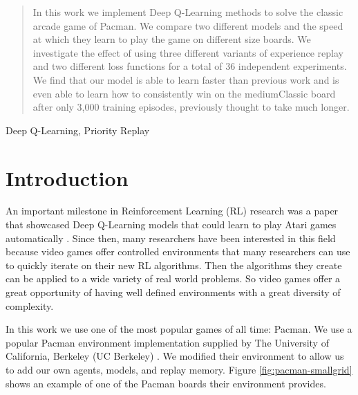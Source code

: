 \documentclass[conference]{IEEEtran}
\begin{document}
\begin{abstract}
In this work we implement Deep Q-Learning methods to solve the classic arcade game of Pacman. We compare two different models and the speed at which they learn to play the game on different size boards. We investigate the effect of using three different variants of experience replay and two different loss functions for a total of 36 independent experiments. We find that our model is able to learn faster than previous work and is even able to learn how to consistently win on the mediumClassic board after only 3,000 training episodes, previously thought to take much longer.
\end{abstract}

\begin{IEEEkeywords}
Deep Q-Learning, Priority Replay
\end{IEEEkeywords}

\section{Introduction}
An important milestone in Reinforcement Learning (RL) research was a paper that showcased Deep Q-Learning models that could learn to play Atari games automatically \cite{Mnih2015}. Since then, many researchers have been interested in this field because video games offer controlled environments that many researchers can use to quickly iterate on their new RL algorithms. Then the algorithms they create can be applied to a wide variety of real world problems. So video games offer a great opportunity of having well defined environments with a great diversity of complexity.

In this work we use one of the most popular games of all time: Pacman. We use a popular Pacman environment implementation supplied by The University of California, Berkeley (UC Berkeley) \cite{berkeley_pacman}. We modified their environment to allow us to add our own agents, models, and replay memory. Figure \ref{fig:pacman-smallgrid} shows an example of one of the Pacman boards their environment provides.
\end{document}
